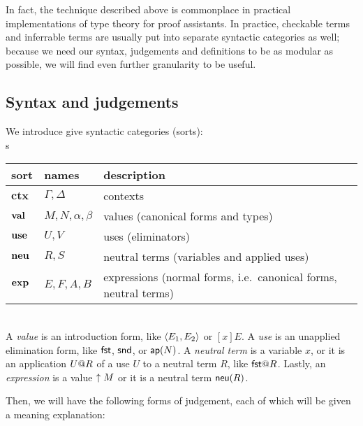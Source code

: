 \documentclass[main.tex]{subfiles}
\begin{document}
In fact, the technique described above is commonplace in practical
implementations of type theory for proof assistants. In practice,
checkable terms and inferrable terms are usually put into separate
syntactic categories as well; because we need our syntax, judgements
and definitions to be as modular as possible, we will find even
further granularity to be useful.

\subsection{Syntax and judgements}

We introduce give syntactic categories (sorts):\\
s

\begin{tabular}{lll}
  \toprule
  sort & names & description\\ \midrule
  $\mathbf{ctx}$ & $\Gamma, \Delta$ & contexts\\
  $\mathbf{val}$ & $M, N, \alpha, \beta$ & values (canonical forms and types) \\
  $\mathbf{use}$ & $U, V$ & uses (eliminators) \\
  $\mathbf{neu}$ & $R, S$ & neutral terms (variables and applied uses) \\
  $\mathbf{exp}$ & $E,F,A,B$ & expressions (normal forms, i.e.\ canonical forms, neutral terms)\\
  \bottomrule
\end{tabular}\\

A \emph{value} is an introduction form, like $\langle E_1,E_2\rangle$ or
$[x]E$. A \emph{use} is an unapplied elimination form, like $\mathsf{fst}$,
$\mathsf{snd}$, or $\mathsf{ap}(N)$. A \emph{neutral term} is a variable $x$, or it
is an application $U@R$ of a use $U$ to a neutral term $R$,
like $\elim{\ufst}{R}$. Lastly, an \emph{expression} is a value $\uparrow M$ or it
is a neutral term $\mathsf{neu}(R)$.

Then, we will have the following forms of judgement, each of which
will be given a meaning explanation:\\
\end{document}
